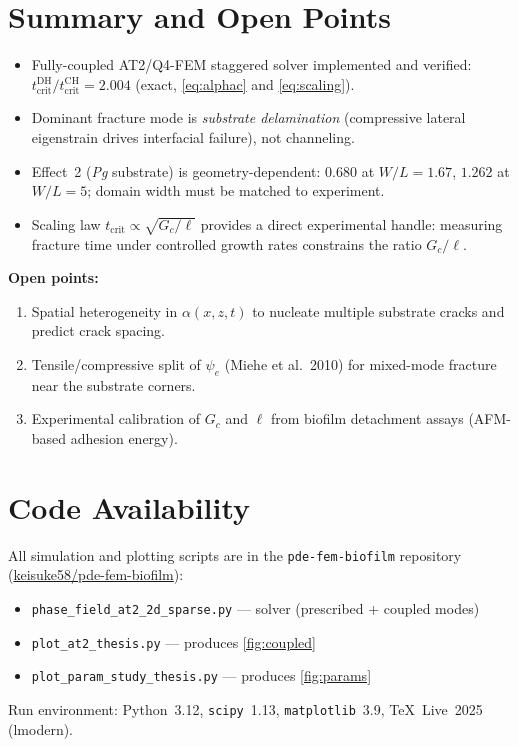 \documentclass[11pt, a4paper]{article}
\newcommand{\Gc}{G_c}
\newcommand{\psiE}{\psi_e}
\begin{document}
\section{Summary and Open Points}
\label{sec:summary}

\begin{itemize}
  \item Fully-coupled AT2/Q4-FEM staggered solver implemented and verified:
        $t_{\mathrm{crit}}^{\mathrm{DH}}/t_{\mathrm{crit}}^{\mathrm{CH}}
        = 2.004$ (exact, \cref{eq:alphac} and \cref{eq:scaling}).
  \item Dominant fracture mode is \emph{substrate delamination}
        (compressive lateral eigenstrain drives interfacial failure), not
        channeling.
  \item Effect~2 (\textit{Pg} substrate) is geometry-dependent: $0.680$ at
        $W/L=1.67$, $1.262$ at $W/L=5$; domain width must be matched to
        experiment.
  \item Scaling law $t_{\mathrm{crit}} \propto \sqrt{\Gc/\ell}$ provides a
        direct experimental handle: measuring fracture time under controlled
        growth rates constrains the ratio $\Gc/\ell$.
\end{itemize}

\noindent\textbf{Open points:}
\begin{enumerate}
  \item Spatial heterogeneity in $\alpha(x,z,t)$ to nucleate multiple
        substrate cracks and predict crack spacing.
  \item Tensile/compressive split of $\psiE$ (Miehe et al.\ 2010) for mixed-mode
        fracture near the substrate corners.
  \item Experimental calibration of $\Gc$ and $\ell$ from biofilm
        detachment assays (AFM-based adhesion energy).
\end{enumerate}

\section*{Code Availability}

All simulation and plotting scripts are in the
\texttt{pde-fem-biofilm} repository (\href{https://github.com/keisuke58/pde-fem-biofilm}{keisuke58/pde-fem-biofilm}):
\begin{itemize}
  \item \texttt{phase\_field\_at2\_2d\_sparse.py} --- solver (prescribed + coupled modes)
  \item \texttt{plot\_at2\_thesis.py} --- produces \cref{fig:coupled}
  \item \texttt{plot\_param\_study\_thesis.py} --- produces \cref{fig:params}
\end{itemize}
Run environment: Python~3.12, \texttt{scipy}~1.13, \texttt{matplotlib}~3.9,
TeX~Live~2025 (lmodern).
\end{document}
